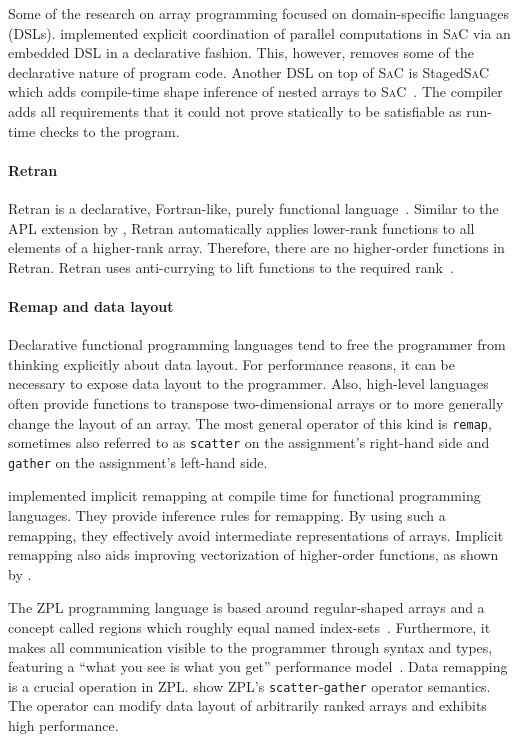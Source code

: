 \documentclass[a4paper]{article}
\newcommand{\sac}{S\textsc{a}C}
\begin{document}
Some of the research on array programming focused on domain-specific languages (DSLs). \citet{4228136} implemented explicit coordination of parallel computations in \sac{} via an embedded DSL in a declarative fashion. This, however, removes some of the declarative nature of program code. Another DSL on top of \sac{} is Staged\sac{} which adds compile-time shape inference of nested arrays to \sac{}~\cite{Ureche:2012:SCS:2103746.2103762}. The compiler adds all requirements that it could not prove statically to be satisfiable as run-time checks to the program.

\paragraph{Retran}

Retran is a declarative, Fortran-like, purely functional language~\cite{367042}. Similar to the APL extension by \citet{Lowney:1981:CAI:567532.567533}, Retran automatically applies lower-rank functions to all elements of a higher-rank array. Therefore, there are no higher-order functions in Retran. Retran uses anti-currying to lift functions to the required rank~\cite{367042}.

\paragraph{Remap and data layout}

Declarative functional programming languages tend to free the programmer from thinking explicitly about data layout. For performance reasons, it can be necessary to expose data layout to the programmer. Also, high-level languages often provide functions to transpose two-dimensional arrays or to more generally change the layout of an array. The most general operator of this kind is \texttt{remap}, sometimes also referred to as \texttt{scatter} on the assignment's right-hand side and \texttt{gather} on the assignment's left-hand side.

\citet{Walinsky:1990:FPL:91556.91610} implemented implicit remapping at compile time for functional programming languages. They provide inference rules for remapping. By using such a remapping, they effectively avoid intermediate representations of arrays. Implicit remapping also aids improving vectorization of higher-order functions, as shown by \citet{Sinkarovs:2013:SDL:2502323.2502332}.

The ZPL programming language is based around regular-shaped arrays and a concept called regions which roughly equal named index-sets~\cite{Chamberlain1999Regions}. Furthermore, it makes all communication visible to the programmer through syntax and types, featuring a ``what you see is what you get'' performance model~\cite{Chamberlain1998ZPLs}. Data remapping is a crucial operation in ZPL.\@ \citet{Deitz:2003:DIP:781498.781526} show ZPL's \texttt{scatter}-\texttt{gather} operator semantics. The operator can modify data layout of arbitrarily ranked arrays and exhibits high performance.
\end{document}
